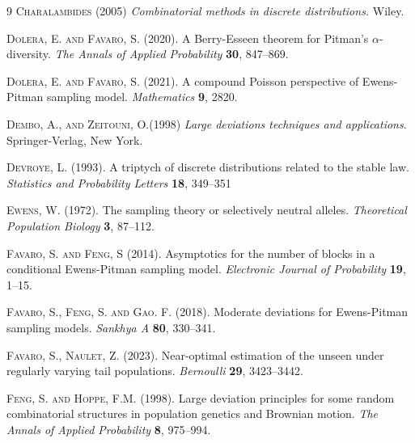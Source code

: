 \documentclass[twoside,12pt]{article}
\begin{document}
\begin{thebibliography}{9}
\textsc{Charalambides} (2005) \textit{Combinatorial methods in discrete distributions.} Wiley.

\textsc{Dolera, E. and Favaro, S.} (2020). A Berry-Esseen theorem for Pitman's $\alpha$-diversity. \textit{The Annals of Applied Probability} \textbf{30}, 847--869.  

\textsc{Dolera, E. and Favaro, S.} (2021). A compound Poisson perspective of Ewens-Pitman sampling model. \textit{Mathematics} \textbf{9}, 2820.

\textsc{Dembo, A., and Zeitouni, O.}(1998) \textit{Large deviations techniques and applications}. Springer-Verlag, New York.

\textsc{Devroye, L.} (1993). A triptych of discrete distributions related to the stable law. \textit{Statistics and Probability Letters} \textbf{18}, 349--351

\textsc{Ewens, W.} (1972). The sampling theory or selectively neutral alleles. \textit{Theoretical Population Biology} \textbf{3}, 87--112.

\textsc{Favaro, S. and Feng, S} (2014). Asymptotics for the number of blocks in a conditional Ewens-Pitman sampling model. \textit{Electronic Journal of Probability} \textbf{19}, 1--15.


\textsc{Favaro, S., Feng, S. and Gao. F.} (2018). Moderate deviations for Ewens-Pitman sampling models. \textit{Sankhya A} \textbf{80}, 330--341.

\textsc{Favaro, S., Naulet, Z.} (2023). Near-optimal estimation of the unseen under regularly varying tail populations. \textit{Bernoulli} \textbf{29}, 3423--3442.


\textsc{Feng, S. and Hoppe, F.M.} (1998). Large deviation principles for some random combinatorial structures in population genetics and Brownian motion. \textit{The Annals of Applied Probability}  \textbf{8}, 975--994.


\end{thebibliography}
\end{document}
